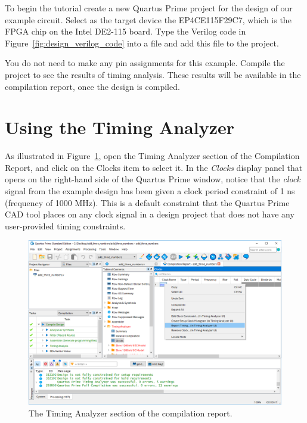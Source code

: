 \documentclass[11pt, twoside, pdftex]{article}
\begin{document}
To begin the tutorial create a new Quartus Prime project for the design of our example circuit. 
Select as the target device the EP4CE115F29C7, which is the FPGA chip on the Intel DE2-115 
board. Type the Verilog code in Figure~\ref{fig:design_verilog_code} into a file and add
this file to the project. 

You do not need to make any pin assignments for this example.  Compile the project to see the 
results of timing analysis. These results will be available in the compilation
report, once the design is compiled. 

\section{Using the Timing Analyzer}

As illustrated in Figure~\ref{fig:SB1}, open the Timing Analyzer section 
of the Compilation Report, and click on the {\sf Clocks} item to select it. 
In the {\it Clocks} display panel that opens on the right-hand side of the Quartus Prime
window, notice that the {\it clock} signal from the example design 
has been given a clock period constraint of 1 ns (frequency of 1000 MHz). This is a
default constraint that the Quartus Prime CAD tool places on any clock signal in a design project
that does not have any user-provided timing constraints. 

\begin{figure}[H]
\begin{center}
\includegraphics[scale=0.5]{figures/SB1.png}
\end{center}
\caption{The Timing Analyzer section of the compilation report.}
\label{fig:SB1}
\end{figure}
\end{document}
